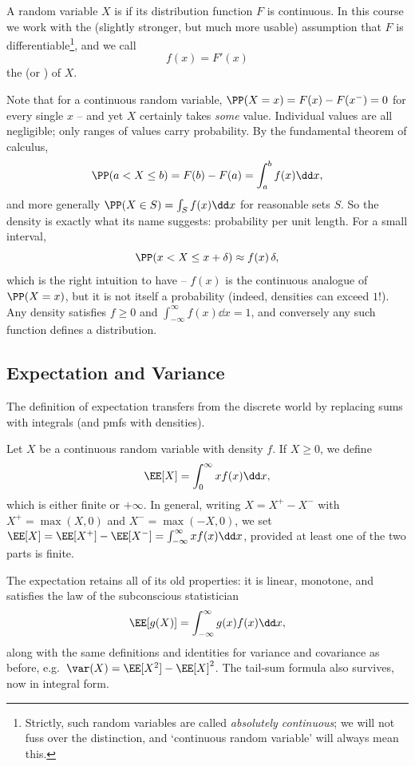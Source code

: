 \begin{definition}
	A random variable $X$ is  if its distribution function $F$ is continuous. In this course we work with the (slightly stronger, but much more usable) assumption that $F$ is differentiable\footnote{Strictly, such random variables are called \emph{absolutely continuous}; we will not fuss over the distinction, and `continuous random variable' will always mean this.}, and we call
	$$
	f(x) = F'(x)
	$$
	the  (or ) of $X$.
\end{definition}

Note that for a continuous random variable, $\PP(X = x) = F(x) - F(x^-) = 0$ for every single $x$ -- and yet $X$ certainly takes \emph{some} value. Individual values are all negligible; only ranges of values carry probability. By the fundamental theorem of calculus,
$$
\PP(a < X \leq b) = F(b) - F(a) = \int_a^b f(x) \dd x,
$$
and more generally $\PP(X \in S) = \int_S f(x)\dd x$ for reasonable sets $S$. So the density is exactly what its name suggests: probability per unit length. For a small interval,
$$
\PP(x < X \leq x + \delta) \approx f(x)\,\delta,
$$
which is the right intuition to have -- $f(x)$ is the continuous analogue of $\PP(X = x)$, but it is not itself a probability (indeed, densities can exceed $1$!). Any density satisfies $f \geq 0$ and $\int_{-\infty}^{\infty} f(x)\dd x = 1$, and conversely any such function defines a distribution.

\subsection{Expectation and Variance}

The definition of expectation transfers from the discrete world by replacing sums with integrals (and pmfs with densities).

\begin{definition}[Expectation]
	Let $X$ be a continuous random variable with density $f$. If $X \geq 0$, we define
	$$
	\EE[X] = \int_0^{\infty} x f(x) \dd x,
	$$
	which is either finite or $+\infty$. In general, writing $X = X^+ - X^-$ with $X^+ = \max(X, 0)$ and $X^- = \max(-X, 0)$, we set $\EE[X] = \EE[X^+] - \EE[X^-] = \int_{-\infty}^{\infty} xf(x)\dd x$, provided at least one of the two parts is finite.
	\end{definition}

The expectation retains all of its old properties: it is linear, monotone, and satisfies the law of the subconscious statistician
$$
\EE[g(X)] = \int_{-\infty}^{\infty} g(x)f(x)\dd x,
$$
along with the same definitions and identities for variance and covariance as before, e.g.\ $\var(X) = \EE[X^2] - \EE[X]^2$. The tail-sum formula also survives, now in integral form.


